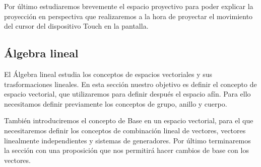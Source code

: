\documentclass[a4paper,11pt, oneside]{book}
\begin{document}
Por último estudiaremos brevemente el espacio proyectivo para poder explicar la proyección en perspectiva que realizaremos a la hora de proyectar el movimiento del cursor del dispositivo Touch en la pantalla.

 


\subsection{Álgebra lineal}

El Álgebra lineal estudia los conceptos de espacios vectoriales y sus trasformaciones lineales. En esta sección nuestro objetivo es definir el concepto de espacio vectorial, que utilizaremos para definir después el espacio afín. Para ello necesitamos definir previamente los conceptos de grupo, anillo y cuerpo. 

También introduciremos el concepto de Base en un espacio vectorial, para el que necesitaremos definir los conceptos de combinación lineal de vectores, vectores linealmente independientes y sistemas de generadores. Por último terminaremos la sección con una proposición que nos permitirá hacer cambios de base con los vectores.
\end{document}
